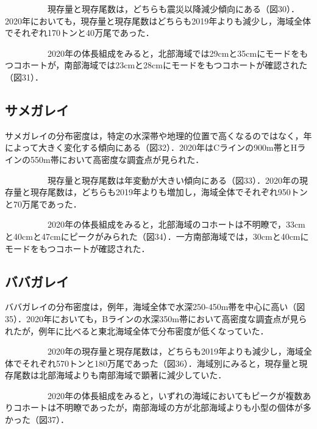 \documentclass[11pt]{article} %
\begin{document}
\begin{linenumbers}
\ \ \ \ \ \ \ \ \ \ 
現存量と現存尾数は，どちらも震災以降減少傾向にある（図30）．2020年においても，現存量と現存尾数はどちらも2019年よりも減少し，海域全体でそれぞれ170トンと40万尾であった．

\ \ \ \ \ \ \ \ \ \ 
2020年の体長組成をみると，北部海域では29cmと35cmにモードをもつコホートが，南部海域では23cmと28cmにモードをもつコホートが確認された（図31）．


\subsection{サメガレイ}
サメガレイの分布密度は，特定の水深帯や地理的位置で高くなるのではなく，年によって大きく変化する傾向にある（図32）．2020年はCラインの900m帯とHラインの550m帯において高密度な調査点が見られた．

\ \ \ \ \ \ \ \ \ \ 
現存量と現存尾数は年変動が大きい傾向にある（図33）．2020年の現存量と現存尾数は，どちらも2019年よりも増加し，海域全体でそれぞれ950トンと70万尾であった．

\ \ \ \ \ \ \ \ \ \ 
2020年の体長組成をみると，北部海域のコホートは不明瞭で，33cmと40cmと47cmにピークがみられた（図34）．一方南部海域では，30cmと40cmにモードをもつコホートが確認された．


\subsection{ババガレイ}
ババガレイの分布密度は，例年，海域全体で水深250-450m帯を中心に高い（図35）．2020年においても，Bラインの水深350m帯において高密度な調査点が見られたが，例年に比べると東北海域全体で分布密度が低くなっていた．

\ \ \ \ \ \ \ \ \ \ 
2020年の現存量と現存尾数は，どちらも2019年よりも減少し，海域全体でそれぞれ570トンと180万尾であった（図36）．海域別にみると，現存量と現存尾数は北部海域よりも南部海域で顕著に減少していた．


\ \ \ \ \ \ \ \ \ \ 
2020年の体長組成をみると，いずれの海域においてもピークが複数ありコホートは不明瞭であったが，南部海域の方が北部海域よりも小型の個体が多かった（図37）．


\end{linenumbers}
\end{document}
